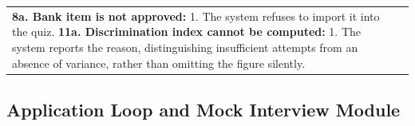 \begin{longtable}{|>{\raggedright\arraybackslash}p{}|>{\raggedright\arraybackslash}p{}|}
\textbf{8a. Bank item is not approved:} \newline
\hspace*{1em}1. The system refuses to import it into the quiz. \newline
\textbf{11a. Discrimination index cannot be computed:} \newline
\hspace*{1em}1. The system reports the reason, distinguishing insufficient attempts from an absence of variance, rather than omitting the figure silently. \\
\end{longtable}

\subsection{Application Loop and Mock Interview Module}

